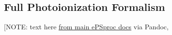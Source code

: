 \subsection{Full Photoionization Formalism \label{appendix:formalism}}

[NOTE: text here \href{https://epsproc.readthedocs.io/en/dev/methods/ePSproc_geom_methods_summary_190821-v1-tidy.html}{from main ePSproc docs} via Pandoc, 